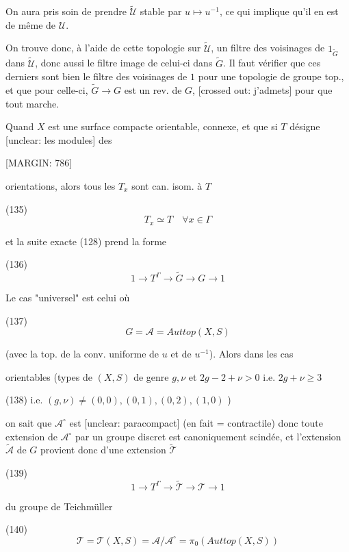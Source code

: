 On aura pris soin de prendre $\tilde{\mathcal{U}}$ stable
par $u \mapsto u^{-1}$, ce qui implique qu'il
en est de même de $\mathcal{U}$.

On trouve donc, à l'aide de cette
topologie sur $\tilde{\mathcal{U}}$, un
filtre des voisinages de $1_{\tilde{G}}$ dans $\tilde{\mathcal{U}}$,
donc aussi le filtre image de celui-ci
dans $\tilde{G}$. Il faut vérifier que ces
derniers sont bien le filtre des voisinages
de $1$ pour une topologie de groupe
top., et que pour celle-ci, $\tilde{G} \to G$
est un rev. de $G$, [crossed out: j'admets]
pour que tout marche.

Quand $X$ est une surface compacte orientable, connexe,
et que si $T$ désigne [unclear: les modules] des

\newpage


[MARGIN: 786]

orientations, alors tous les $T_x$ sont can.
isom. à $T$

(135) $$T_x \simeq T \quad \forall x \in \Gamma$$

et la suite exacte (128) prend la forme

(136) $$1 \longrightarrow T^\Gamma \longrightarrow \tilde{G} \longrightarrow G \longrightarrow 1$$

Le cas "universel" est celui où

(137) $$G = \mathcal{A} = Auttop(X,S)$$

(avec la top. de la conv. uniforme de
$u$ et de $u^{-1}$). Alors dans les cas

orientables (types de $(X,S)$ de genre $g,\nu$
et $2g-2+\nu > 0$ i.e. $2g+\nu \ge 3$

(138) i.e. $(g,\nu) \neq (0,0), (0,1), (0,2), (1,0)$ )

on sait que $\mathcal{A}^\circ$ est [unclear: paracompact]
(en fait = contractile) donc toute extension
de $\mathcal{A}^\circ$ par un groupe discret est
canoniquement scindée, et l'extension $\tilde{\mathcal{A}}$ de
$G$ provient donc d'une extension $\tilde{\mathcal{T}}$

(139) $$1 \longrightarrow T^\Gamma \longrightarrow \tilde{\mathcal{T}} \longrightarrow \mathcal{T} \longrightarrow 1$$

du groupe de Teichmüller

(140) $$\mathcal{T} = \mathcal{T}(X,S) = \mathcal{A}/\mathcal{A}^\circ = \pi_0(Auttop(X,S))$$

\newpage


